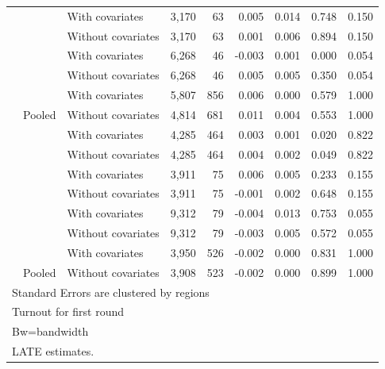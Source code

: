 \documentclass[
  12pt,
]{article}
\begin{document}
\begin{table}[H]
\begin{tabular}[t]{lllrrrrrr}
 &  & With covariates & 3,170 & 63 & 0.005 & 0.014 & 0.748 & 0.150\\


 & \multirow{-2}{*}{\raggedright\arraybackslash 40000} & Without covariates & 3,170 & 63 & 0.001 & 0.006 & 0.894 & 0.150\\


 &  & With covariates & 6,268 & 46 & -0.003 & 0.001 & 0.000 & 0.054\\


 & \multirow{-2}{*}{\raggedright\arraybackslash 60000} & Without covariates & 6,268 & 46 & 0.005 & 0.005 & 0.350 & 0.054\\


 &  & With covariates & 5,807 & 856 & 0.006 & 0.000 & 0.579 & 1.000\\


\multirow{-8}{*}{\raggedright\arraybackslash 2010} & \multirow{-2}{*}{\raggedright\arraybackslash Pooled} & Without covariates & 4,814 & 681 & 0.011 & 0.004 & 0.553 & 1.000\\

\cmidrule{1-9}
 &  & With covariates & 4,285 & 464 & 0.003 & 0.001 & 0.020 & 0.822\\


 & \multirow{-2}{*}{\raggedright\arraybackslash 20000} & Without covariates & 4,285 & 464 & 0.004 & 0.002 & 0.049 & 0.822\\


 &  & With covariates & 3,911 & 75 & 0.006 & 0.005 & 0.233 & 0.155\\


 & \multirow{-2}{*}{\raggedright\arraybackslash 40000} & Without covariates & 3,911 & 75 & -0.001 & 0.002 & 0.648 & 0.155\\


 &  & With covariates & 9,312 & 79 & -0.004 & 0.013 & 0.753 & 0.055\\


 & \multirow{-2}{*}{\raggedright\arraybackslash 60000} & Without covariates & 9,312 & 79 & -0.003 & 0.005 & 0.572 & 0.055\\


 &  & With covariates & 3,950 & 526 & -0.002 & 0.000 & 0.831 & 1.000\\


\multirow{-8}{*}{\raggedright\arraybackslash 2012} & \multirow{-2}{*}{\raggedright\arraybackslash Pooled} & Without covariates & 3,908 & 523 & -0.002 & 0.000 & 0.899 & 1.000\\
\bottomrule
\multicolumn{9}{l}{\rule{0pt}{1em}Standard Errors are clustered by regions}\\
\multicolumn{9}{l}{\rule{0pt}{1em}Turnout for first round}\\
\multicolumn{9}{l}{\rule{0pt}{1em}Bw=bandwidth}\\
\multicolumn{9}{l}{\rule{0pt}{1em}LATE estimates.}\\
\end{tabular}
\end{table}
\end{document}
